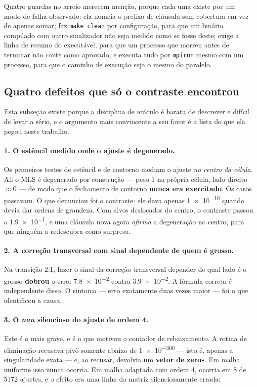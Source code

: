 Quatro guardas no arreio merecem menção, porque cada uma existe por um modo de
falha observado: ela nomeia o prefixo de cláusula sem cobertura em vez de apenas
somar; faz \verb|make clean| por configuração, para que um binário compilado com
outro sinalizador não seja medido como se fosse deste; exige a linha de resumo do
executável, para que um processo que morreu antes de terminar não conte como
aprovado; e executa tudo por \verb|mpirun| mesmo com um processo, para que o
caminho de execução seja o mesmo do paralelo.

\subsection{Quatro defeitos que só o contraste encontrou}
\label{sec:verif-defeitos}

Esta subseção existe porque a disciplina de oráculo é barata de descrever e difícil
de levar a sério, e o argumento mais convincente a seu favor é a lista do que ela
pegou neste trabalho.

\paragraph{1. O estêncil medido onde o ajuste é degenerado.} Os primeiros testes
de estêncil e de contorno mediam o ajuste \emph{no centro da célula}. Ali o MLS é
degenerado por construção --- peso $1$ na própria célula, lado direito
$\approx 0$ --- de modo que o fechamento de contorno \textbf{nunca era
exercitado}. Os casos passavam. O que denunciou foi o contraste: ele dava apenas
\num{1e-10} quando devia dar ordens de grandeza. Com alvos deslocados do centro, o
contraste passou a \num{1.9e-1}, e uma cláusula nova agora \emph{afirma} a
degeneração no centro, para que ninguém a redescubra como surpresa.

\paragraph{2. A correção transversal com sinal dependente de quem é grosso.} Na
transição 2:1, fazer o sinal da correção transversal depender de qual lado é o
grosso \textbf{dobrou} o erro: \num{7.8e-2} contra \num{3.9e-2}. A fórmula correta
é independente disso. O sintoma --- erro exatamente duas vezes maior --- foi o que
identificou a causa.

\paragraph{3. O \emph{nan} silencioso do ajuste de ordem 4.} Este é o mais grave,
e é o que motivou o contador de rebaixamento. A rotina de eliminação recusava
pivô somente abaixo de \num{1e-300} --- isto é, apenas a singularidade exata --- e,
ao recusar, devolvia um \textbf{vetor de zeros}. Em malha uniforme isso nunca
ocorria. Em malha adaptada com ordem 4, ocorria em 8 de \num{5172} ajustes, e o
efeito era uma linha da matriz silenciosamente errada:

